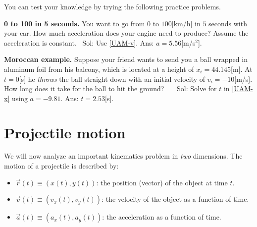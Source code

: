 \documentclass[letterpaper,9pt,journal]{IEEEtran}
\begin{document}
\medskip
You can test your knowledge by trying the following practice problems.



{\bf 0 to 100 in 5 seconds.}
You want to go from $0$ to $100$[km/h] in $5$ seconds with your car.
How much acceleration does your engine need to produce?
Assume the acceleration is constant. \ Sol: Use \eqref{UAM-v}. Ans: $a=5.56$[m/s$^2$].



{\bf Moroccan example.}
Suppose your friend wants to send you a ball wrapped in aluminum 
foil from his balcony, which is located at a height of $x_i=44.145$[m]. 
At  $t=0$[s] he \emph{throws} the ball straight down with an initial velocity 
of $v_i=-10$[m/s]. How long does it take for the ball to hit the ground?
%
\ \ \ Sol: Solve for $t$ in \eqref{UAM-x} using $a=-9.81$.  Ans: $t=2.53$[s].










\section{Projectile motion}
\label{sec:projectile-motion}
We will now analyze an important kinematics problem in \emph{two} dimensions.
The motion of a projectile is described by:
\begin{itemize}
\item  $\vec{r}(t)\equiv (x(t),y(t))$: the position (vector) of the object at time $t$.
\item  $\vec{v}(t) \equiv (v_x(t), v_y(t) ) $: the velocity of the object as a function of time.
\item  $\vec{a}(t) \equiv (a_x(t), a_y(t) ) $: the acceleration as a function of time.
\end{itemize}
\end{document}
